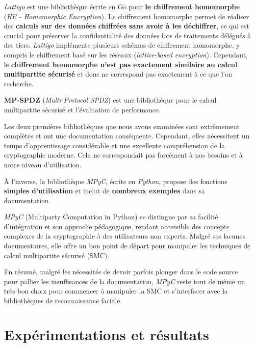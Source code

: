 \documentclass[12pt,a4paper]{article}
\begin{document}
\textit{Lattigo} est une bibliothèque écrite en Go pour \textbf{le chiffrement homomorphe} (\textit{HE - Homomorphic Encryption}). Le chiffrement homomorphe permet de réaliser des \textbf{calculs sur des données chiffrées sans avoir à les déchiffrer}, ce qui est crucial pour préserver la confidentialité des données lors de traitements délégués à des tiers. \textit{Lattigo} implémente plusieurs schémas de chiffrement homomorphe, y compris le chiffrement basé sur les réseaux (\textit{lattice-based encryption}). Cependant, le \textbf{chiffrement homomorphe n'est pas exactement similaire au calcul multipartite sécurisé} et donc ne correspond pas exactement à ce que l'on recherche.

\textbf{MP-SPDZ} (\textit{Multi-Protocol SPDZ}) est une bibliothèque pour le calcul multipartite sécurisé et l'évaluation de performance.

Les deux premières bibliothèques que nous avons examinées sont extrêmement complètes et ont une documentation conséquente. Cependant, elles nécessitent un temps d'apprentissage considérable et une excellente compréhension de la cryptographie moderne. Cela ne correspondait pas forcément à nos besoins et à notre niveau d'utilisation.

À l'inverse, la bibliothèque \textit{MPyC}, écrite en \textit{Python}, propose des fonctions \textbf{simples d'utilisation} et inclut de \textbf{nombreux exemples} dans sa documentation. 

\textit{MPyC} (Multiparty Computation in Python) se distingue par sa facilité d'intégration et son approche pédagogique, rendant accessible des concepts complexes de la cryptographie à des utilisateurs non experts. Malgré ses lacunes documentaires, elle offre un bon point de départ pour manipuler les techniques de calcul multipartite sécurisé (SMC).

En résumé, malgré les nécessités de devoir parfois plonger dans le code source pour pallier les insuffisances de la documentation, \textit{MPyC} reste tout de même un très bon choix pour commencer à manipuler la SMC et s'interfacer avec la bibliothèques de reconnaissance faciale.

\section{Expérimentations et résultats}
\end{document}

